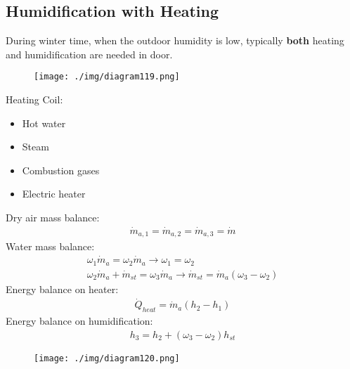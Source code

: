 \subsection{Humidification with Heating}
During winter time, when the outdoor humidity is low, typically \textbf{both} heating and humidification are needed in door.
\begin{figure}[H]
  \centering
  \texttt{[image: ./img/diagram119.png]}
  \caption{}
\end{figure}
Heating Coil:
\begin{itemize}[noitemsep]
  \item Hot water
  \item Steam
  \item Combustion gases
  \item Electric heater
\end{itemize}
Dry air mass balance:
\begin{gather}
  \dot{m}_{a,1} = \dot{m}_{a,2} = \dot{m}_{a,3} = \dot{m}
\end{gather}
Water mass balance:
\begin{gather}
  \omega_1\dot{m}_{a} = \omega_2\dot{m}_{a} \longrightarrow \omega_1 = \omega_2 \\[5pt]
  \omega_2\dot{m}_{a} + \dot{m}_{st} = \omega_3\dot{m}_{a} \longrightarrow \dot{m}_{st} = \dot{m}_{a}(\omega_3-\omega_2)
\end{gather}
Energy balance on heater:
\begin{gather}
  \dot{Q}_{heat} = \dot{m}_{a}(h_2-h_1)
\end{gather}
Energy balance on humidification:
\begin{gather}
  h_3 = h_2 + (\omega_3-\omega_2)h_{st}
\end{gather}
\begin{figure}[H]
  \centering
  \texttt{[image: ./img/diagram120.png]}
  \caption{}
\end{figure}
